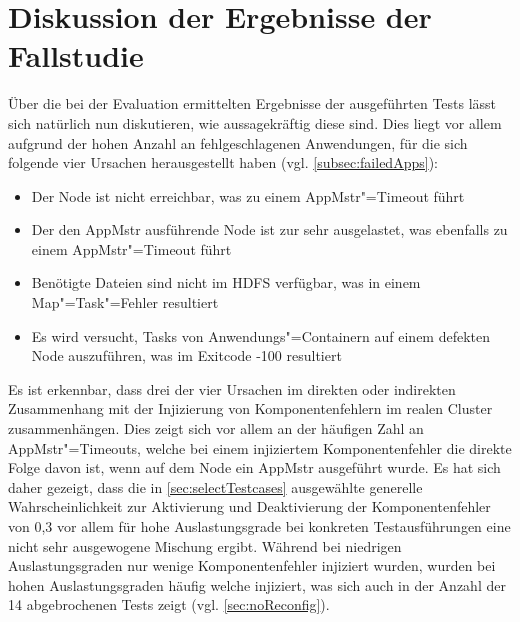 \section{Diskussion der Ergebnisse der Fallstudie}
\label{sec:discussionResults}

Über die bei der Evaluation ermittelten Ergebnisse der ausgeführten Tests lässt sich natürlich nun diskutieren, wie aussagekräftig diese sind.
Dies liegt vor allem aufgrund der hohen Anzahl an fehlgeschlagenen Anwendungen, für die sich folgende vier Ursachen herausgestellt haben (vgl. \cref{subsec:failedApps}):

\begin{itemize}
    \item Der Node ist nicht erreichbar, was zu einem \gls{AppMstr}"=Timeout führt
    \item Der den \gls{AppMstr} ausführende Node ist zur sehr ausgelastet, was ebenfalls zu einem \gls{AppMstr}"=Timeout führt
    \item Benötigte Dateien sind nicht im \gls{HDFS} verfügbar, was in einem Map"=Task"=Fehler resultiert
    \item Es wird versucht, Tasks von Anwendungs"=Containern auf einem defekten Node auszuführen, was im Exitcode -100 resultiert
\end{itemize}

Es ist erkennbar, dass drei der vier Ursachen im direkten oder indirekten Zusammenhang mit der Injizierung von Komponentenfehlern im realen Cluster zusammenhängen.
Dies zeigt sich vor allem an der häufigen Zahl an \gls{AppMstr}"=Timeouts, welche bei einem injiziertem Komponentenfehler die direkte Folge davon ist, wenn auf dem Node ein \gls{AppMstr} ausgeführt wurde.
Es hat sich daher gezeigt, dass die in \cref{sec:selectTestcases} ausgewählte generelle Wahrscheinlichkeit zur Aktivierung und Deaktivierung der Komponentenfehler von 0,3 vor allem für hohe Auslastungsgrade bei konkreten Testausführungen eine nicht sehr ausgewogene Mischung ergibt.
Während bei niedrigen Auslastungsgraden nur wenige Komponentenfehler injiziert wurden, wurden bei hohen Auslastungsgraden häufig welche injiziert, was sich auch in der Anzahl der 14 abgebrochenen Tests zeigt (vgl. \cref{sec:noReconfig}).

